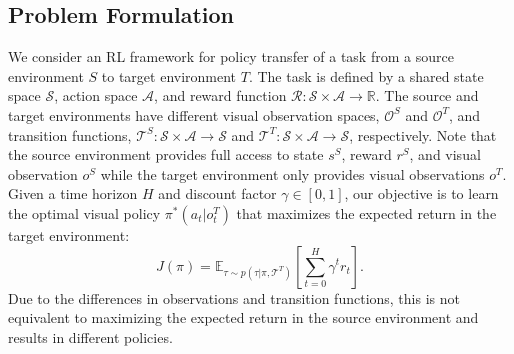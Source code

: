 



\subsection{Problem Formulation}
\label{sec:problem_formulation}

We consider an RL framework for policy transfer of a task from a source environment $S$ to target environment $T$.  The task is defined by a shared state space $\mathcal{S}$, action space $\mathcal{A}$, and reward function $\mathcal{R}: \mathcal{S} \times \mathcal{A} \rightarrow \mathbb{R}$.  The source and target environments have different visual observation spaces, $\mathcal{O}^S$ and $\mathcal{O}^T$, and transition functions, $\mathcal{T}^S: \mathcal{S} \times \mathcal{A} \rightarrow \mathcal{S}$ and $\mathcal{T}^T: \mathcal{S} \times \mathcal{A} \rightarrow \mathcal{S}$, respectively.  Note that the source environment provides full access to state $s^S$, reward $r^S$, and visual observation $o^S$ while the target environment only provides visual observations $o^T$.  Given a time horizon $H$ and discount factor $\gamma \in [0,1]$, our objective is to learn the optimal visual policy $\pi^*(a_t|o^T_t)$ that maximizes the expected return in the target environment:  
\begin{equation}
    \label{eqn:target_J}
    J(\pi) = \mathbb{E}_{\tau \sim p(\tau|\pi,\mathcal{T}^T )} \left [\sum_{t=0}^H \gamma^t r_t \right ].
\end{equation}
Due to the differences in observations and transition functions, this is not equivalent to maximizing the expected return in the source environment and results in different policies.


